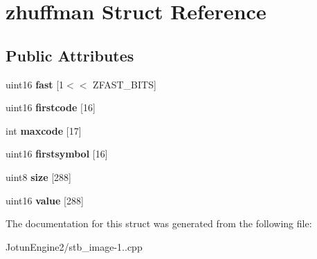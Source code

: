 \hypertarget{structzhuffman}{\section{zhuffman Struct Reference}
\label{structzhuffman}
}
\subsection*{Public Attributes}
\begin{DoxyCompactItemize}
\item 
\hypertarget{structzhuffman_a12d5f92a121b65680e5f0b4027d00c96}{uint16 {\bfseries fast} \mbox{[}1$<$$<$ Z\-F\-A\-S\-T\-\_\-\-B\-I\-T\-S\mbox{]}}\label{structzhuffman_a12d5f92a121b65680e5f0b4027d00c96}

\item 
\hypertarget{structzhuffman_a81f5ae5bd31b40439955de6154572917}{uint16 {\bfseries firstcode} \mbox{[}16\mbox{]}}\label{structzhuffman_a81f5ae5bd31b40439955de6154572917}

\item 
\hypertarget{structzhuffman_ac7dd4a2bf01a6e27933dd1cf6b0cc762}{int {\bfseries maxcode} \mbox{[}17\mbox{]}}\label{structzhuffman_ac7dd4a2bf01a6e27933dd1cf6b0cc762}

\item 
\hypertarget{structzhuffman_afbdb21fd99f413fc8f9e58243552fe95}{uint16 {\bfseries firstsymbol} \mbox{[}16\mbox{]}}\label{structzhuffman_afbdb21fd99f413fc8f9e58243552fe95}

\item 
\hypertarget{structzhuffman_a46ce4d4a4d7fc41c2560616f6696e9b9}{uint8 {\bfseries size} \mbox{[}288\mbox{]}}\label{structzhuffman_a46ce4d4a4d7fc41c2560616f6696e9b9}

\item 
\hypertarget{structzhuffman_acc395b638b700b944c329d71a8b82084}{uint16 {\bfseries value} \mbox{[}288\mbox{]}}\label{structzhuffman_acc395b638b700b944c329d71a8b82084}

\end{DoxyCompactItemize}


The documentation for this struct was generated from the following file\-:\begin{DoxyCompactItemize}
\item 
Jotun\-Engine2/stb\-\_\-image-\/1..\-cpp\end{DoxyCompactItemize}
